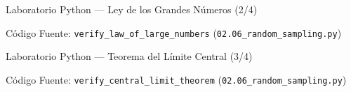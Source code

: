 \documentclass[10pt, aspectratio=169]{beamer}
\begin{document}
\begin{frame}[fragile]{Laboratorio Python --- Ley de los Grandes Números (2/4)}
  \vspace{-0.1cm}
  \begin{block}{Código Fuente: \texttt{verify\_law\_of\_large\_numbers} (\texttt{02.06\_random\_sampling.py})}
    
  \end{block}
\end{frame}

\begin{frame}[fragile]{Laboratorio Python --- Teorema del Límite Central (3/4)}
  \vspace{-0.1cm}
  \begin{block}{Código Fuente: \texttt{verify\_central\_limit\_theorem} (\texttt{02.06\_random\_sampling.py})}
    
  \end{block}
\end{frame}
\end{document}
